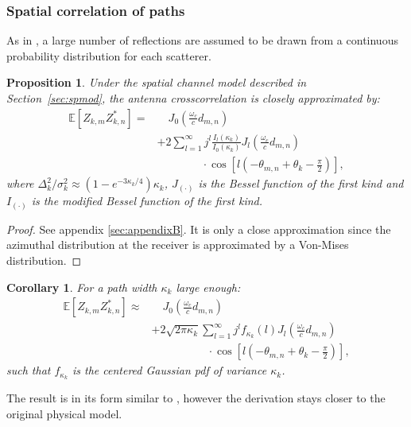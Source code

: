 \documentclass[journal,10pt]{IEEEtran}
\providecommand{\Esp}[1]{\mathbb{E}\left[#1\right]}
\newtheorem{proposition}{Proposition}
\newtheorem{corollary}{Corollary}
\begin{document}
\subsubsection{Spatial correlation of paths}
As in \cite{Salz1994}, a large number of reflections are assumed to be drawn from a continuous probability distribution for each scatterer. 
\begin{proposition}\label{prop:spacecorr}
Under the spatial channel model described in Section~\ref{sec:spmod}, the antenna crosscorrelation is closely approximated by:
\begin{align}
\Esp{Z_{k,m}Z_{k,n}^\ast}=&\quad J_0\left(\frac{\omega_c}{c}d_{m,n}\right)\nonumber\\&+2\sum_{l=1}^\infty j^{l}\frac{I_l(\kappa_k)}{I_0(\kappa_k)}J_l\left(\frac{\omega_c}{c}d_{m,n}\right)\\
&\qquad\qquad\cdot\cos\left[l\left(-\theta_{m,n}+\theta_k-\frac{\pi}{2}\right)\right],\nonumber
\end{align}
where $\Delta_k^2/\sigma_k^2\approx (1-e^{-3\kappa_k/4})\kappa_k$, $J_{(\cdot)}$ is the Bessel function of the first kind and $I_{(\cdot)}$ is the modified Bessel function of the first kind.
\end{proposition}
\begin{proof}
See appendix \ref{sec:appendixB}. It is only a close approximation since the azimuthal distribution at the receiver is approximated by a Von-Mises distribution.
\end{proof}
\begin{corollary}
For a path width $\kappa_k$ large enough:
\begin{align}
\Esp{Z_{k,m}Z_{k,n}^\ast}\approx &\quad J_0\left(\frac{\omega_c}{c}d_{m,n}\right)\nonumber\\
&+2\sqrt{2\pi\kappa_k}\sum_{l=1}^\infty j^{l}f_{\kappa_k}(l)J_l\left(\frac{\omega_c}{c}d_{m,n}\right)\\
&\qquad\qquad\quad \cdot\cos\left[l\left(-\theta_{m,n}+\theta_k-\frac{\pi}{2}\right)\right],\nonumber
\end{align}
such that $f_{\kappa_k}$ is the centered Gaussian pdf of variance $\kappa_k$.
\end{corollary}
The result is in its form similar to \cite{Salz1994}, however the derivation stays closer to the original physical model. 
\end{document}
